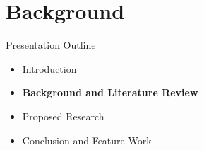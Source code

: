 \documentclass{beamer}
\begin{document}
%
%

\section{Background}
\begin{frame}{Presentation Outline}
    \begin{itemize}
     	\itemsep=.5cm
    	\item Introduction
    	\item {\bf Background and Literature Review}
    	\item Proposed Research
    	\item Conclusion and Feature Work
    \end{itemize}
\end{frame}
\end{document}
